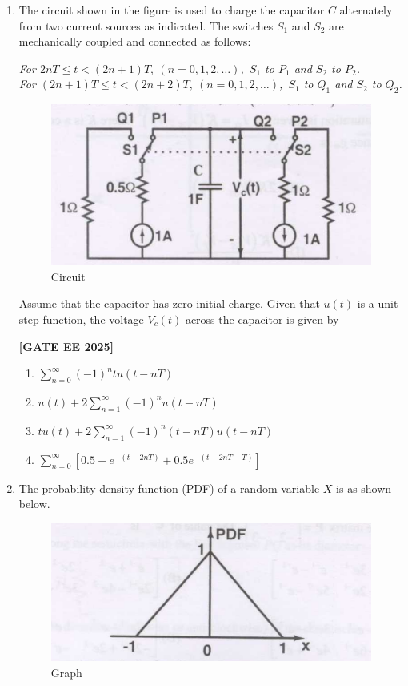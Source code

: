 \documentclass[12pt]{article}
\begin{document}
\begin{enumerate}[leftmargin=*, label=\textbf{Q.\arabic*:}]
\item The circuit shown in the figure is used to charge the capacitor $C$ alternately from two current sources as indicated. The switches $S_1$ and $S_2$ are mechanically coupled and connected as follows:

\textit{For $2nT \leq t < (2n+1)T,\ (n=0,1,2,\ldots)$,\ $S_1$ to $P_1$ and $S_2$ to $P_2$.}\\
\textit{For $(2n+1)T \leq t < (2n+2)T,\ (n=0,1,2,\ldots)$,\ $S_1$ to $Q_1$ and $S_2$ to $Q_2$.}
\begin{figure}[H]\centering
\includegraphics[width=0.7\columnwidth]{figs/q23.png}
\caption{Circuit}
\label{fig:q23}
\end{figure}
Assume that the capacitor has zero initial charge. Given that $u(t)$ is a unit step function, the voltage $V_c(t)$ across the capacitor is given by
 
\noindent \textbf{[GATE EE 2025]}
\begin{multicols}{2}
\begin{enumerate}
  \item $\displaystyle\sum_{n=0}^\infty (-1)^n t u(t-nT)$
  \item $\displaystyle u(t) + 2 \sum_{n=1}^\infty (-1)^n u(t-nT)$
  \item $\displaystyle t u(t) + 2 \sum_{n=1}^\infty (-1)^n (t-nT)u(t-nT)$
  \item $\displaystyle \sum_{n=0}^\infty \left[ 0.5 - e^{-(t-2nT)} + 0.5e^{-(t-2nT-T)} \right]$
\end{enumerate}
\end{multicols}

\newpage

\item
The probability density function (PDF) of a random variable $X$ is as shown below.

\begin{figure}[H]\centering
\includegraphics[width=0.5\columnwidth]{figs/q24a.png}
\caption{Graph}
\label{fig:q24a}
\end{figure}


\end{enumerate}
\end{document}
